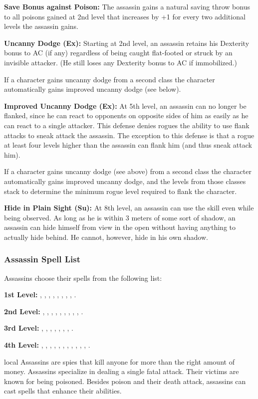 {\textbf{Save Bonus against Poison:} The assassin gains a natural saving throw bonus to all poisons gained at 2nd level that increases by +1 for every two additional levels the assassin gains.

\textbf{Uncanny Dodge (Ex):} Starting at 2nd level, an assassin retains his Dexterity bonus to AC (if any) regardless of being caught flat-footed or struck by an invisible attacker. (He still loses any Dexterity bonus to AC if immobilized.)

If a character gains uncanny dodge from a second class the character automatically gains improved uncanny dodge (see below).

\textbf{Improved Uncanny Dodge (Ex):} At 5th level, an assassin can no longer be flanked, since he can react to opponents on opposite sides of him as easily as he can react to a single attacker. This defense denies rogues the ability to use flank attacks to sneak attack the assassin. The exception to this defense is that a rogue at least four levels higher than the assassin can flank him (and thus sneak attack him).

If a character gains uncanny dodge (see above) from a second class the character automatically gains improved uncanny dodge, and the levels from those classes stack to determine the minimum rogue level required to flank the character.

\textbf{Hide in Plain Sight (Su):} At 8th level, an assassin can use the  skill even while being observed. As long as he is within 3 meters of some sort of shadow, an assassin can hide himself from view in the open without having anything to actually hide behind. He cannot, however, hide in his own shadow.

\subsubsection{Assassin Spell List}
Assassins choose their spells from the following list:

\textbf{1st Level:} , , , , , , , , .

\textbf{2nd Level:} , , , , , , , , , .

\textbf{3rd Level:} , , , , , , , .

\textbf{4th Level:} , , , , , , , , , , , .
}
{}
{local}
{Assassins are spies that kill anyone for more than the right amount of money.}
{Assassins specialize in dealing a single fatal attack. Their victims are known for being poisoned.}
{Besides poison and their death attack, assassins can cast spells that enhance their abilities.}